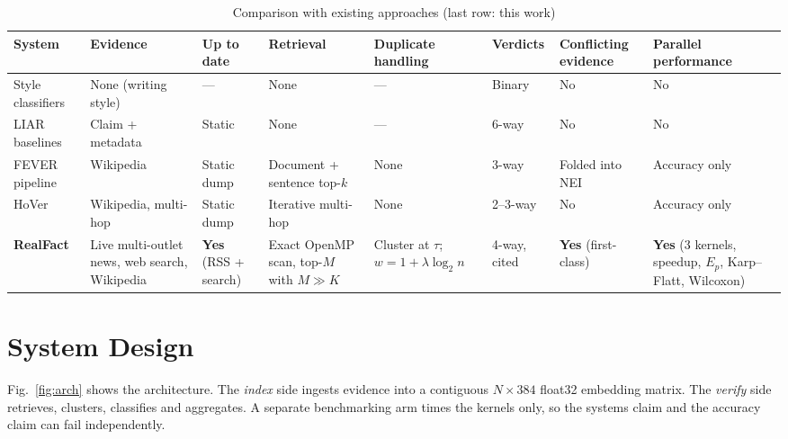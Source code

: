 \documentclass[conference,a4paper]{IEEEtran}
\newcommand{\yes}{\textcolor{sup}{\textbf{Yes}}}
\newcommand{\no}{\textcolor{con}{No}}
\begin{document}
\begin{table}[!t]
\caption{Comparison with existing approaches (last row: this work)}
\label{tab:compare}
\centering\footnotesize
\setlength{\tabcolsep}{4pt}
\begin{tabularx}{\textwidth}{P{2.4cm}YP{1.7cm}YYP{1.4cm}YY}
\toprule
\textbf{System} & \textbf{Evidence} & \textbf{Up to date} & \textbf{Retrieval} & \textbf{Duplicate handling} & \textbf{Verdicts} & \textbf{Conflicting evidence} & \textbf{Parallel performance}\\
\midrule
Style classifiers & None (writing style) & --- & None & --- & Binary & \no & \no\\
LIAR baselines~\cite{liar} & Claim + metadata & Static & None & --- & 6-way & \no & \no\\
FEVER pipeline~\cite{fever} & Wikipedia & Static dump & Document + sentence top-$k$ & None & 3-way & Folded into NEI & Accuracy only\\
HoVer~\cite{hover} & Wikipedia, multi-hop & Static dump & Iterative multi-hop & None & 2--3-way & \no & Accuracy only\\
\textbf{RealFact} & Live multi-outlet news, web search, Wikipedia & \yes{} (RSS + search) & Exact OpenMP scan, top-$M$ with $M\gg K$ & Cluster at $\tau$; $w=1+\lambda\log_2 n$ & 4-way, cited & \yes{} (first-class) & \yes{} (3 kernels, speedup, $E_p$, Karp--Flatt, Wilcoxon)\\
\bottomrule
\end{tabularx}
\end{table}

\section{System Design}
\label{sec:design}

Fig.~\ref{fig:arch} shows the architecture. The \emph{index} side ingests evidence into a contiguous $N\times384$
float32 embedding matrix. The \emph{verify} side retrieves, clusters, classifies and aggregates. A separate
benchmarking arm times the kernels only, so the systems claim and the accuracy claim can fail independently.
\end{document}
